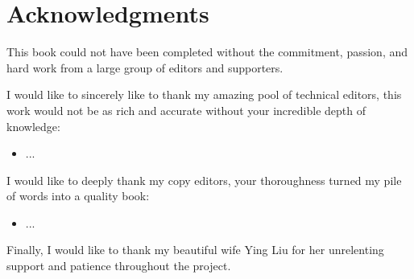 % 
% 
\section*{Acknowledgments}
This book could not have been completed without the commitment, passion, and hard work from a large group of editors and supporters.

I would like to sincerely like to thank my amazing pool of technical editors, this work would not be as rich and accurate without your incredible depth of knowledge:

\begin{itemize}
	\item ...
\end{itemize}

I would like to deeply thank my copy editors, your thoroughness turned my pile of words into a quality book:

\begin{itemize}
	\item ...
\end{itemize}


Finally, I would like to thank my beautiful wife Ying Liu for her unrelenting support and patience throughout the project.